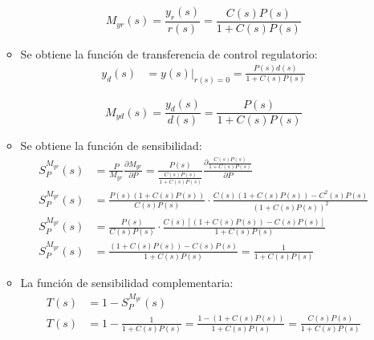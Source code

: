 \begin{itemize}
\begin{itemize}
      \begin{equation*}
        \tag{Función de Transferencia del servo control}
        M_{yr}(s) = \frac{y_r(s)}{r(s)} = \frac{C(s) P(s)}{1 + C(s) P(s)}
      \end{equation*}

      \item
      Se obtiene la función de transferencia de control regulatorio:
      \begin{align*}
        y_{d}(s) &= y(s)|_{r(s)=0} = \frac{P(s) d(s) }{1 + C(s) P(s)}
      \end{align*}

      \begin{equation*}
        \tag{Función de Transferencia del control regulatorio}
        M_{yd}(s) = \frac{y_d(s)}{d(s)} = \frac{P(s)}{1 + C(s) P(s)}
      \end{equation*}

      \item
      Se obtiene la función de sensibilidad:
      \begin{align*}
        S_P^{M_{yr}}(s) &= \frac{P}{M_{yr}} \frac{\partial M_{yr}}{\partial P} 
          =
          \frac{P(s)}{\frac{C(s) P(s)}{1 + C(s) P(s)}} 
          \frac{\partial \frac{C(s) P(s)}{1 + C(s) P(s)}}{\partial P} 
          \\
        S_P^{M_{yr}}(s) &=
          \frac{P(s)(1 + C(s) P(s))}{C(s) P(s)} \cdot
          \frac{C(s)(1 + C(s) P(s)) - C^2(s)P(s)}{(1 + C(s) P(s))^2}
          \\
        S_P^{M_{yr}}(s) &=
          \frac{P(s)}{C(s) P(s)} \cdot
          \frac{C(s)\left[(1 + C(s) P(s)) - C(s)P(s)\right]}{1 + C(s) P(s)}
          \\
        S_P^{M_{yr}}(s) &=
          \frac{(1 + C(s) P(s)) - C(s)P(s)}{1 + C(s) P(s)} =
          \frac{1}{1 + C(s) P(s)}
      \end{align*}

      \item
      La función de sensibilidad complementaria:
      \begin{align*}
        T(s) &= 1 - S_P^{M_{yr}}(s)
        \\
        T(s) &= 1 - \frac{1}{1 + C(s) P(s)} = \frac{1-(1+C(s)P(s))}{1 + C(s) P(s)} = \frac{C(s) P(s)}{1 + C(s) P(s)}
      \end{align*}
    \end{itemize}
  \end{itemize}



